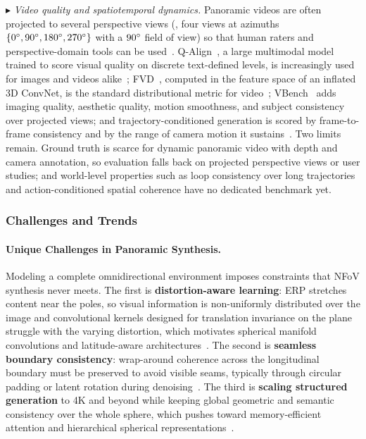 $\blacktriangleright$ \textit{Video quality and spatiotemporal dynamics.} Panoramic videos are often projected to several perspective views (\eg, four views at azimuths $\{0^\circ, 90^\circ, 180^\circ, 270^\circ\}$ with a $90^\circ$ field of view) so that human raters and perspective-domain tools can be used~\cite{team2025hunyuanworld,yang2024layerpano3d,tan2024imagine360}.
Q-Align~\cite{wu2023qalign}, a large multimodal model trained to score visual quality on discrete text-defined levels, is increasingly used for images and videos alike~\cite{team2025hunyuanworld,tan2024imagine360}; FVD~\cite{unterthiner2018fvd}, computed in the feature space of an inflated 3D ConvNet, is the standard distributional metric for video~\cite{panflow,xia2025panowan}; VBench~\cite{huang2023vbench} adds imaging quality, aesthetic quality, motion smoothness, and subject consistency over projected views; and trajectory-conditioned generation is scored by frame-to-frame consistency and by the range of camera motion it sustains~\cite{yin2025panoworld}.
Two limits remain. Ground truth is scarce for dynamic panoramic video with depth and camera annotation, so evaluation falls back on projected perspective views or user studies; and world-level properties such as loop consistency over long trajectories and action-conditioned spatial coherence have no dedicated benchmark yet.


\subsubsection{Challenges and Trends}
\label{subsubsec:p3_s8_2_4_challenges}

\paragraph{Unique Challenges in Panoramic Synthesis.}
Modeling a complete omnidirectional environment imposes constraints that NFoV synthesis never meets.
The first is \textbf{distortion-aware learning}: ERP stretches content near the poles, so visual information is non-uniformly distributed over the image and convolutional kernels designed for translation invariance on the plane struggle with the varying distortion, which motivates spherical manifold convolutions and latitude-aware architectures~\cite{sun2025spherical,zheng2025panorama}.
The second is \textbf{seamless boundary consistency}: wrap-around coherence across the longitudinal boundary must be preserved to avoid visible seams, typically through circular padding or latent rotation during denoising~\cite{panflow,xia2025panowan}.
The third is \textbf{scaling structured generation} to 4K and beyond while keeping global geometric and semantic consistency over the whole sphere, which pushes toward memory-efficient attention and hierarchical spherical representations~\cite{pansplat,liu2025dynamicscaler}.


